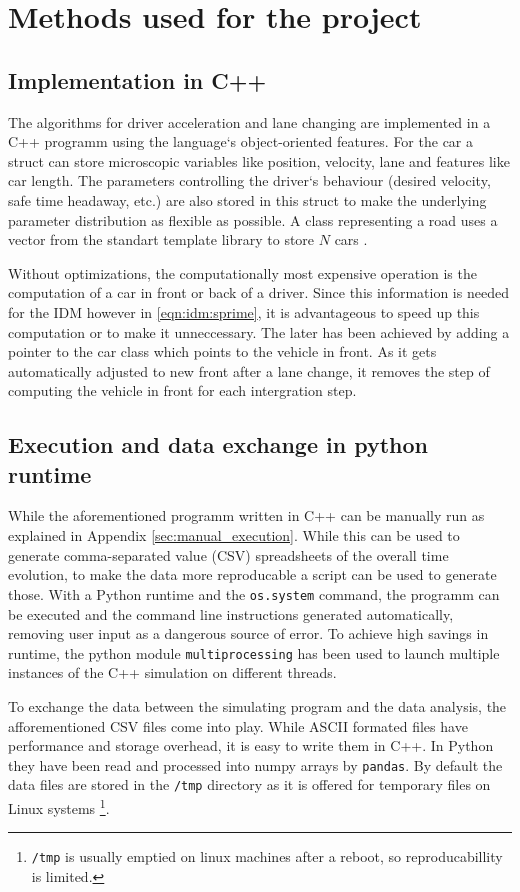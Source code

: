 \section{Methods used for the project}
\label{sec:methods}

\subsection{Implementation in C++}
\label{sec:implementation}
The algorithms for driver acceleration and lane changing are implemented in a C++ programm using the language`s
object-oriented features. For the car a struct can store microscopic variables like position, velocity, lane and
features like car length. The parameters controlling the driver`s behaviour (desired velocity, safe time headaway, etc.)
are also stored in this struct to make the underlying parameter distribution as flexible as possible. A class
representing a road uses a vector from the standart template library to store $N$ cars \cite{cpp-vector}.

Without optimizations, the computationally most expensive operation is the computation of a car in front or back of a
driver. Since this information is needed for the IDM however in \ref{eqn:idm:sprime}, it is advantageous to speed up
this computation or to make it unneccessary. The later has been achieved by adding a pointer to the car class which
points to the vehicle in front. As it gets automatically adjusted to new front after a lane change, it removes the step
of computing the vehicle in front for each intergration step.

\subsection{Execution and data exchange in python runtime}
While the aforementioned programm written in C++ can be manually run as explained in Appendix
\ref{sec:manual_execution}. While this can be used to generate comma-separated value (CSV) spreadsheets of the overall time
evolution, to make the data more reproducable a script can be used to generate those. With a Python runtime and the
\texttt{os.system}
command, the programm can be executed and the command line instructions generated automatically, removing user input as
a dangerous source of error. To achieve high savings in runtime, the python module \texttt{multiprocessing} has been
used to launch multiple instances of the C++ simulation on different threads. 

To exchange the data between the simulating program and the data analysis, the afforementioned 
CSV files come into play. While ASCII formated files have performance and storage 
overhead, it is easy to write them in C++. In Python they have been read and
processed into numpy arrays by \texttt{pandas}. By default the data files are stored in the
\texttt{/tmp} directory as it is offered for temporary files on Linux systems
\footnote{\texttt{/tmp} is usually emptied on linux machines after a reboot, so reproducabillity is
limited.}.


